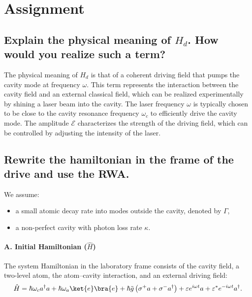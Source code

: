 \section{Assignment}
\subsection{Explain the physical meaning of $H_d$. How would you realize such a term?}

The physical meaning of $H_d$ is that of a coherent driving field that pumps the cavity mode at frequency $\omega$. This term represents the interaction between the cavity field and an external classical field, which can be realized experimentally by shining a laser beam into the cavity. The laser frequency $\omega$ is typically chosen to be close to the cavity resonance frequency $\omega_c$ to efficiently drive the cavity mode. The amplitude $\mathcal{E}$ characterizes the strength of the driving field, which can be controlled by adjusting the intensity of the laser.
\subsection{Rewrite the hamiltonian in the frame of the drive and use the RWA.}




We assume:
\begin{itemize}
    \item a small atomic decay rate into modes outside the cavity, denoted by $\Gamma$,
    \item a non-perfect cavity with photon loss rate $\kappa$.
\end{itemize}

\paragraph{A. Initial Hamiltonian ($\hat{H}$)}


The system Hamiltonian in the laboratory frame consists of the cavity field, a two-level atom, the atom–cavity interaction, and an external driving field:
\begin{equation}
\hat{H}
=
\hbar \omega_c a^\dagger a
+
\hbar \omega_a \ket{e}\bra{e}
+
\hbar \tilde{g} \left( \sigma^+ a + \sigma^- a^\dagger \right)
+
\varepsilon e^{i\omega t} a
+
\varepsilon^* e^{-i\omega t} a^\dagger .
\end{equation}

